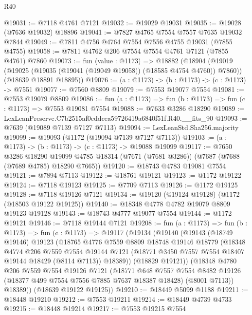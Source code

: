 \begin{lexlean}{R40}
\begin{coremodule}
@19031 := @7118 @4761 @7121
@19032 := @19029 @19031
@19035 := @19028 (@7636 @19032) @18896
@19041 := @7827 @4765 @7554 @7557 @7635 @19032 @7844
@19049 := @7811 @4756 @4764 @7554 @7556 @4755 @19031 (@7855 @4755)
@19058 := @7811 @4762 @206 @7554 @7554 @4761 @7121 (@7855 @4761) @7860
@19073 := fun (value : @1173) =>
  @18882
    (@18904
      (@19019 (@19025 (@19035 (@19041 (@19049 @19058)) (@18585 @4754 @4760)) @7860))
      (@18639 @18891 @18895))
@19076 := (a : @1173) -> (b : @1173) -> (c : @1173) -> @7551
@19077 := @7560 @8809
@19079 := @7553 @19077 @7554
@19081 := @7553 @19079 @8809
@19086 := fun (a : @1173) => fun (b : @1173) => fun (c : @1173) => @7553 @19081 @7554
@19088 := @7633 @3286 @18290
@19089 := LexLeanPreserve.C7b2515af0eddeea59726419a6840f51f.R40.__fits_90
@19093 := @7639 (@19089 @7139 @7127 @7113)
@19094 := LexLeanStd.Sha256.majority
@19099 := @19093 (@1172 (@19094 @7139 @7127 @7113))
@19103 := (a : @1173) -> (b : @1173) -> (c : @1173) -> @19088 @19099
@19117 := @7650
    @3286
    @18290
    @19099
    @4785
    @18314
    (@7671 (@7681 @3286))
    (@7687 (@7688 (@7689 @4785) @18290 @7665))
@19120 := @18743 @4783 @19081 @7554
@19121 := @7894 @7113
@19122 := @18761 @19121
@19123 := @1172 @19122
@19124 := @7118 @19123
@19125 := @7709 @7113
@19126 := @1172 @19125
@19128 := @7118 @19126 @7121
@19134 := @19120 (@19124 @19128) (@1172 (@18503 @19122 @19125))
@19140 := @18348 @4778 @4782 @19079 @8809 @19123 @19128
@19143 := @18743 @4777 @19077 @7554
@19144 := @1172 @19121
@19146 := @7118 @19144 @7121
@19208 := fun (a : @1173) =>
  fun (b : @1173) =>
  fun (c : @1173) =>
  @19117
    (@19134
      (@19140
        (@19143
          (@18749 @19146)
          @19123
          (@18765
            @4776
            @7559
            @8809
            @18748
            @19146
            @18779
            (@18348
              @4774
              @206
              @7559
              @7554
              @19144
              @7121
              (@18771 @3450 @7557 @7554 @18407 @19144 @18429 (@8114 @7113))
              @18389))
          (@18829 @19121))
        (@18348
          @4780
          @206
          @7559
          @7554
          @19126
          @7121
          (@18771
            @648
            @7557
            @7554
            @8482
            @19126
            (@18377 @499 @7554 @7556 @7885 @7637 @18387 @18428)
            (@8001 @7113))
          @18389))
      (@18639 @19122 @19125))
@19210 := @18449 @5099 @1188
@19211 := @18448 @19210
@19212 := @7553 @19211
@19214 := @18449 @4739 @4733
@19215 := @18448 @19214
@19217 := @7553 @19215 @7554

\end{coremodule}
\end{lexlean}
